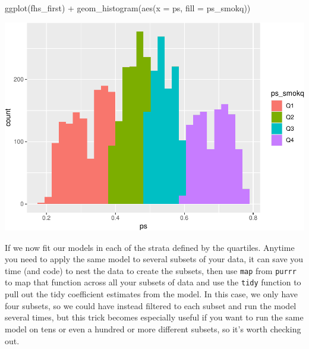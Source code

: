 \documentclass[
]{book}
\newenvironment{Shaded}{\begin{snugshade}}{\end{snugshade}}
\newcommand{\AttributeTok}[1]{\textcolor[rgb]{0.77,0.63,0.00}{#1}}
\newcommand{\FunctionTok}[1]{\textcolor[rgb]{0.00,0.00,0.00}{#1}}
\newcommand{\NormalTok}[1]{#1}
\newcommand{\SpecialCharTok}[1]{\textcolor[rgb]{0.00,0.00,0.00}{#1}}
\begin{document}
\begin{Shaded}
\begin{Highlighting}[]
\FunctionTok{ggplot}\NormalTok{(fhs\_first) }\SpecialCharTok{+}
  \FunctionTok{geom\_histogram}\NormalTok{(}\FunctionTok{aes}\NormalTok{(}\AttributeTok{x =}\NormalTok{ ps, }\AttributeTok{fill =}\NormalTok{ ps\_smokq))}
\end{Highlighting}
\end{Shaded}

\includegraphics{adv_epi_analysis_files/figure-latex/unnamed-chunk-279-1.pdf}

If we now fit our models in each of the strata defined by the quartiles. Anytime you need to apply the same model to several subsets of your data, it can save you time (and code) to nest the data to create the subsets, then use \texttt{map} from \texttt{purrr} to map that function across all your subsets of data and use the \texttt{tidy} function to pull out the tidy coefficient estimates from the model. In this case, we only have four subsets, so we could have instead filtered to each subset and run the model several times, but this trick becomes especially useful if you want to run the same model on tens or even a hundred or more different subsets, so it's worth checking out.
\end{document}
